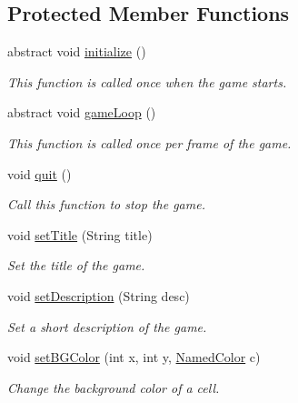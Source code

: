 \subsection*{Protected Member Functions}
\begin{DoxyCompactItemize}
\item 
abstract void \mbox{\hyperlink{classbridges_1_1games_1_1_game_base_a973a52d5eee7c29b01d668fba3c61657}{initialize}} ()
\begin{DoxyCompactList}\small\item\em This function is called once when the game starts. \end{DoxyCompactList}\item 
abstract void \mbox{\hyperlink{classbridges_1_1games_1_1_game_base_a56d05ed744791cfc1c3792f39ff438f1}{game\+Loop}} ()
\begin{DoxyCompactList}\small\item\em This function is called once per frame of the game. \end{DoxyCompactList}\item 
void \mbox{\hyperlink{classbridges_1_1games_1_1_game_base_aa16a69dc83ee4e32150188e8acf1f897}{quit}} ()
\begin{DoxyCompactList}\small\item\em Call this function to stop the game. \end{DoxyCompactList}\item 
void \mbox{\hyperlink{classbridges_1_1games_1_1_game_base_a9f55e84af9bbf6497b314181c9d79f0a}{set\+Title}} (String title)
\begin{DoxyCompactList}\small\item\em Set the title of the game. \end{DoxyCompactList}\item 
void \mbox{\hyperlink{classbridges_1_1games_1_1_game_base_a3df3bee5b9d32cc9f164d06f9e9707dc}{set\+Description}} (String desc)
\begin{DoxyCompactList}\small\item\em Set a short description of the game. \end{DoxyCompactList}\item 
void \mbox{\hyperlink{classbridges_1_1games_1_1_game_base_ac9a231dd4425eb0f9dea2377653b23c4}{set\+B\+G\+Color}} (int x, int y, \mbox{\hyperlink{enumbridges_1_1base_1_1_named_color}{Named\+Color}} c)
\begin{DoxyCompactList}\small\item\em Change the background color of a cell. \end{DoxyCompactList}\item 

\end{DoxyCompactItemize}
